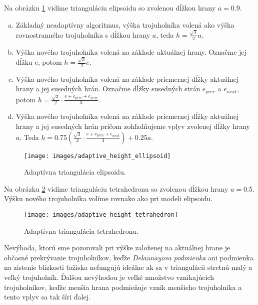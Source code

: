 Na obrázku \ref{obr:adaptive_height_ellipsoid} vidíme trianguláciu elipsoidu so zvolenou
dĺžkou hrany $a=0.9$.
\begin{enumerate}[a)]
\item{
    Základný neadaptívny algoritmus, výška trojuholníka volená ako výška rovnostranného trojuholníka
    s dĺžkou hrany $a$, teda $h=\frac{\sqrt{3}}{2} a$.
}
\item{
    Výška nového trojuholníka volená na základe aktuálnej hrany. Označme jej dĺžku e, potom  
    $h=\frac{\sqrt{3}}{2} e$.
}
\item{
    Výška nového trojuholníka volená na základe priemernej dĺžky aktuálnej hrany a jej susedných hrán. 
    Označme dĺžky susedných strán $e_{prev}$ a $e_{next}$, potom  
    $h=\frac{\sqrt{3}}{2} \cdot \frac{e+e_{prev}+e_{next}}{3}$.
}
\item{
    Výška nového trojuholníka volená na základe priemernej dĺžky aktuálnej hrany a jej susedných hrán
    pričom zohľadňujeme vplyv zvolenej dĺžky hrany $a$. Teda
    $h=0.75(\frac{\sqrt{3}}{2} \cdot \frac{e+e_{prev}+e_{next}}{3}) + 0.25 a$.
}
\end{enumerate}


\begin{figure}
    \centerline{\texttt{[image: images/adaptive\_height\_ellipsoid]}}
    \caption[Adaptívna triangulácia elipsoidu]
    {Adaptívna triangulácia elipsoidu.}
    \label{obr:adaptive_height_ellipsoid}
\end{figure}

Na obrázku \ref{obr:adaptive_height_tetrahedron} vidíme trianguláciu tetrahedronu so zvolenou
dĺžkou hrany $a=0.5$. Výšku nového trojuholníka volíme rovnako ako pri modeli elipsoidu.

\begin{figure}
    \centerline{\texttt{[image: images/adaptive\_height\_tetrahedron]}}
    \caption[Adaptívna triangulácia tetrahedronu]
    {Adaptívna triangulácia tetrahedronu.}
    \label{obr:adaptive_height_tetrahedron}
\end{figure}


\renewcommand{\arraystretch}{1}
\setlength{\fboxsep}{2mm} %
\setlength{\tabcolsep}{4pt}

    Nevýhoda, ktorú sme pozorovali pri výške založenej na aktuálnej hrane je občasné prekrývanie
    trojuholníkov, keďže \textit{Delaunayova podmienka} ani podmienka na zistenie blízkosti
    ťažiska nefungujú ideálne ak sa v triangulácii stretnú malý a veľký trojuholník.
    Ďalšou nevýhodou je veľké množstvo vznikajúcich trojuholníkov, keďže menšia hrana podmieňuje
    vznik menšieho trojuholníka a tento vplyv sa tak šíri ďalej.

